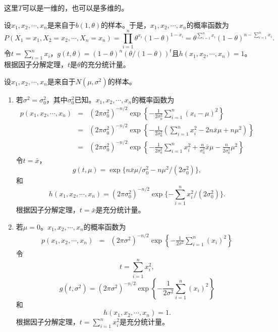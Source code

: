 \begin{remark}
    这里$T$可以是一维的，也可以是多维的。
\end{remark}

\begin{example}
设$x_1,x_2,\cdots,x_n$是来自于$b(1,\theta)$的样本。于是，$x_1,x_2,\cdots,x_n$的概率函数为
$$
P(X_1=x_1,X_2=x_2,\cdots,X_n=x_n) = \prod_{i=1}^n \theta^{x_i}(1-\theta)^{1-x_i} = \theta^{\sum_{i=1}^n x_i} (1-\theta)^{n - \sum_{i=1}^n x_i}.
$$
令$t = \sum_{i=1}^n x_i$，$g(t,\theta) = (1-\theta)^{n} \left(\theta/(1-\theta)\right)^t $且$h(x_1,x_2,\cdots,x_n) = 1$。根据因子分解定理，$t$是$\theta$的充分统计量。
\end{example}

\begin{example}
    设$x_1,x_2,\cdots,x_n$是来自于$N(\mu,\sigma^2)$的样本。 
\begin{enumerate}
    \item 若$\sigma^2 = \sigma_0^2$，其中$ \sigma_0^2$已知。$x_1,x_2,\cdots,x_n$的概率函数为
    \begin{eqnarray*}
        p(x_1,x_2,\cdots,x_n) &=
        &(2\pi\sigma_0^2)^{-n/2} \exp\left\{ - \frac{1}{2\sigma_0^2} \sum_{i=1}^n (x_i-\mu)^2\right\}\\
        &=&(2\pi\sigma_0^2)^{-n/2}  \exp\left\{ - \frac{1}{2\sigma_0^2} \left(\sum_{i=1}^n x_i^2 - 2n \bar{x}\mu + n\mu^2\right)\right\}\\
        &=& (2\pi\sigma_0^2)^{-n/2}  \exp\left\{ - \frac{1}{2\sigma_0^2} \sum_{i=1}^n x_i^2 + \frac{n}{\sigma_0^2} \bar{x}\mu -\frac{n}{2\sigma_0^2}\mu^2\right\}
    \end{eqnarray*}
令$t = \bar{x}$，$$g(t,\mu) = \exp\{n\bar{x}\mu / \sigma_0^2 - n\mu^2/(2\sigma_0^2)\},$$
和$$h(x_1,x_2,\cdots,x_n) = (2\pi\sigma_0^2)^{-n/2} \exp\{ -\sum_{i=1}^n x_i^2/(2\sigma_0^2)\}.$$根据因子分解定理，$t=\bar{x}$是充分统计量。
\item 若$\mu = 0$。$x_1,x_2,\cdots,x_n$的概率函数为
\begin{eqnarray*}
     p(x_1,x_2,\cdots,x_n) &=
        &(2\pi\sigma^2)^{-n/2} \exp\left\{ - \frac{1}{2\sigma^2} \sum_{i=1}^n (x_i)^2\right\}
\end{eqnarray*}
令$$
t = \sum_{i=1}^n x_i^2,
$$
$$g(t,\sigma^2) = (2\pi\sigma^2)^{-n/2} \exp\left\{ - \frac{1}{2\sigma^2} \sum_{i=1}^n (x_i)^2\right\}$$
和
$$
h(x_1,x_2,\cdots,x_n) = 1.
$$
根据因子分解定理，$t = \sum_{i=1}^n x_i^2$是充分统计量。


\end{enumerate}
\end{example}

